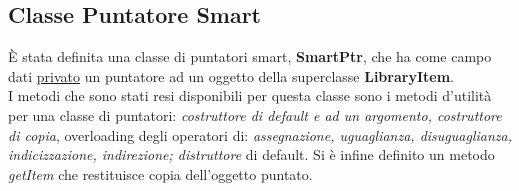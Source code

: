{		\subsection{Classe Puntatore Smart}{
			È stata definita una classe di puntatori smart, \textbf{SmartPtr}, che ha come campo dati \underline{privato} un puntatore ad un oggetto della superclasse \textbf{LibraryItem}. \\
			I metodi che sono stati resi disponibili per questa classe sono i metodi d'utilità per una classe di puntatori:
			\textit{costruttore di default e ad un argomento, costruttore di copia}, overloading degli operatori di: \textit{assegnazione, uguaglianza, disuguaglianza, indicizzazione, indirezione; distruttore} di default. Si è infine definito un metodo \textit{getItem} che restituisce copia dell'oggetto puntato.
		}
	}
